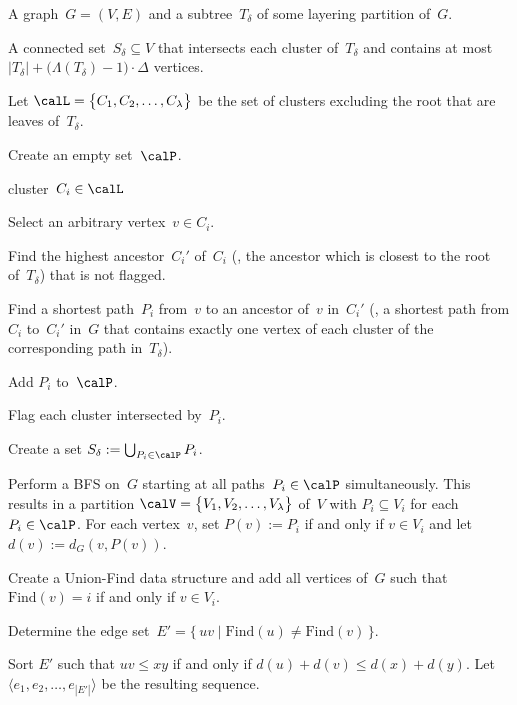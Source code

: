 \begin{algorithm}
    [!htb]
    \caption
    {%
        Computes a connected vertex set that intersects each cluster of a given layering partition.
    }
    \label{algo:Tdelta}

\KwIn
{%
    A graph~$G = (V, E)$ and a subtree~$T_\delta$ of some layering partition of~$G$.
}

\KwOut
{%
    A connected set~$S_\delta \subseteq V$ that intersects each cluster of~$T_\delta$ and contains at most $|T_\delta| + \big( \Lambda(T_\delta) - 1 \big) \cdot \Delta$ vertices.
}

Let $\calL = \big \{ C_1, C_2, \ldots, C_\lambda \big \}$ be the set of clusters excluding the root that are leaves of~$T_\delta$.

Create an empty set~$\calP$.
\label{line:createEmptyP}

\ForEach
{%
    cluster~\( C_i \in \calL \)
}
{%
    Select an arbitrary vertex~$v \in C_i$.

    Find the highest ancestor~$C_i'$ of~$C_i$ (\ie, the ancestor which is closest to the root of~$T_\delta$) that is not flagged.

    Find a shortest path~$P_i$ from~$v$ to an ancestor of~$v$ in~$C_i'$ (\ie, a shortest path from $C_i$ to~$C_i'$ in~$G$ that contains exactly one vertex of each cluster of the corresponding path in~$T_\delta$).

    Add $P_i$ to~$\calP$.

    Flag each cluster intersected by~$P_i$.
    \label{line:flagPiClusters}
}

Create a set $S_\delta := \bigcup_{P_i \in \calP} P_i$.
\label{line:addPtoS}

Perform a BFS on~$G$ starting at all paths~$P_i \in \calP$ simultaneously.
This results in a partition $\calV = \big \{ V_1, V_2, \ldots, V_\lambda \big \}$ of~$V$ with $P_i \subseteq V_i$ for each $P_i \in \calP$.
For each vertex~$v$, set $P(v) := P_i$ if and only if $v \in V_i$ and let $d(v) := d_G(v, P(v))$.
\label{line:performBFS}

Create a Union-Find data structure and add all vertices of~$G$ such that $\mathrm{Find}(v) = i$ if and only if $v \in V_i$.
\label{line:initUnionFind}

Determine the edge set~$E' = \{ \, uv \mid \mathrm{Find}(u) \neq \mathrm{Find}(v) \, \}$.
\label{line:determineEprime}

Sort $E'$ such that $uv \leq xy$ if and only if $d(u) + d(v) \leq d(x) + d(y)$.
Let $\langle e_1, e_2, \ldots, e_{|E'|} \rangle$ be the resulting sequence.
\label{line:sortEprime}


\end{algorithm}

